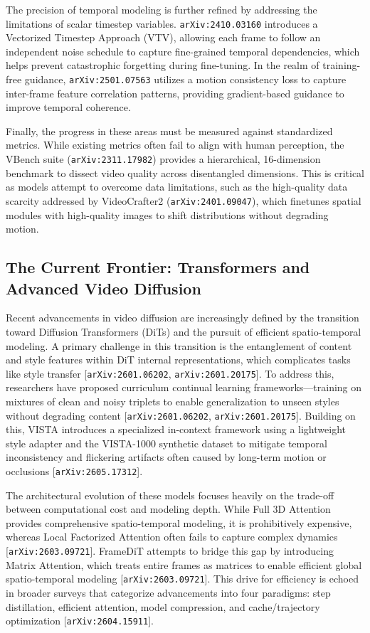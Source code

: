 \documentclass[11pt]{article}
\begin{document}
The precision of temporal modeling is further refined by addressing the limitations of scalar timestep variables. \texttt{arXiv:2410.03160} introduces a Vectorized Timestep Approach (VTV), allowing each frame to follow an independent noise schedule to capture fine-grained temporal dependencies, which helps prevent catastrophic forgetting during fine-tuning. In the realm of training-free guidance, \texttt{arXiv:2501.07563} utilizes a motion consistency loss to capture inter-frame feature correlation patterns, providing gradient-based guidance to improve temporal coherence.

Finally, the progress in these areas must be measured against standardized metrics. While existing metrics often fail to align with human perception, the VBench suite (\texttt{arXiv:2311.17982}) provides a hierarchical, 16-dimension benchmark to dissect video quality across disentangled dimensions. This is critical as models attempt to overcome data limitations, such as the high-quality data scarcity addressed by VideoCrafter2 (\texttt{arXiv:2401.09047}), which finetunes spatial modules with high-quality images to shift distributions without degrading motion.

\subsection{The Current Frontier: Transformers and Advanced Video Diffusion}

Recent advancements in video diffusion are increasingly defined by the transition toward Diffusion Transformers (DiTs) and the pursuit of efficient spatio-temporal modeling. A primary challenge in this transition is the entanglement of content and style features within DiT internal representations, which complicates tasks like style transfer [\texttt{arXiv:2601.06202}, \texttt{arXiv:2601.20175}]. To address this, researchers have proposed curriculum continual learning frameworks—training on mixtures of clean and noisy triplets to enable generalization to unseen styles without degrading content [\texttt{arXiv:2601.06202}, \texttt{arXiv:2601.20175}]. Building on this, VISTA introduces a specialized in-context framework using a lightweight style adapter and the VISTA-1000 synthetic dataset to mitigate temporal inconsistency and flickering artifacts often caused by long-term motion or occlusions [\texttt{arXiv:2605.17312}].

The architectural evolution of these models focuses heavily on the trade-off between computational cost and modeling depth. While Full 3D Attention provides comprehensive spatio-temporal modeling, it is prohibitively expensive, whereas Local Factorized Attention often fails to capture complex dynamics [\texttt{arXiv:2603.09721}]. FrameDiT attempts to bridge this gap by introducing Matrix Attention, which treats entire frames as matrices to enable efficient global spatio-temporal modeling [\texttt{arXiv:2603.09721}]. This drive for efficiency is echoed in broader surveys that categorize advancements into four paradigms: step distillation, efficient attention, model compression, and cache/trajectory optimization [\texttt{arXiv:2604.15911}].
\end{document}
